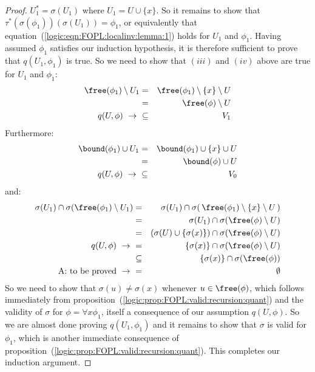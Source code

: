 \begin{proof}
$U_{1}^{*}=\sigma(U_{1})$ where $U_{1}=U\cup\{x\}$. So it remains to show that
$\tau^{*}(\sigma(\phi_{1}))(\sigma(U_{1}))=\phi_{1}$, or
equivalently that equation~(\ref{logic:eqn:FOPL:localinv:lemma:1})
holds for $U_{1}$ and $\phi_{1}$. Having assumed $\phi_{1}$
satisfies our induction hypothesis, it is therefore sufficient to
prove that $q(U_{1},\phi_{1})$ is true. So we need to show that
$(iii)$ and $(iv)$ above are true for $U_{1}$ and $\phi_{1}$:
    \begin{eqnarray*}\free(\phi_{1})\setminus U_{1}
        &=&\free(\phi_{1})\setminus\{x\}\setminus U\\
        &=&\free(\phi)\setminus U\\
        q(U,\phi)\ \to\ 
        &\subseteq& V_{1}
    \end{eqnarray*}
Furthermore:
    \begin{eqnarray*}\bound(\phi_{1})\cup U_{1}
        &=&\bound(\phi_{1})\cup\{x\}\cup U\\
        &=&\bound(\phi)\cup U\\
        q(U,\phi)\ \to\ 
        &\subseteq& V_{0}
    \end{eqnarray*}
and:
    \begin{eqnarray*}\sigma(U_{1})\cap\sigma(\free(\phi_{1})\setminus U_{1})
        &=&\sigma(U_{1})\cap\sigma(\,\free(\phi_{1})\setminus\{x\}\setminus U\,)\\
        &=&\sigma(U_{1})\cap\sigma(\free(\phi)\setminus U)\\
        &=&(\sigma(U)\cup\{\sigma(x)\})\cap\sigma(\free(\phi)\setminus U)\\
        q(U,\phi)\ \to\ 
        &=&\{\sigma(x)\}\cap\sigma(\free(\phi)\setminus U)\\
        &\subseteq&\{\sigma(x)\}\cap\sigma(\free(\phi))\\
        \mbox{A: to be proved}\ \to\ 
        &=&\emptyset
    \end{eqnarray*}
So we need to show that $\sigma(u)\neq\sigma(x)$ whenever
$u\in\free(\phi)$, which follows immediately from
proposition~(\ref{logic:prop:FOPL:valid:recursion:quant}) and the
validity of $\sigma$ for $\phi=\forall x\phi_{1}$, itself a
consequence of our assumption $q(U,\phi)$. So we are almost done
proving $q(U_{1},\phi_{1})$ and it remains to show that $\sigma$ is
valid for $\phi_{1}$, which is another immediate consequence of
proposition~(\ref{logic:prop:FOPL:valid:recursion:quant}). This
completes our induction argument.
\end{proof}

